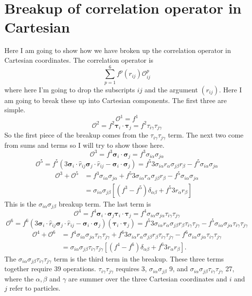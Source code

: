 \documentclass[12pt]{extarticle}
\newcommand{\Oijp}{\mathcal{O}^p_{ij}}
\newcommand{\taui}{\bm{\tau}_i}
\newcommand{\tauj}{\bm{\tau}_j}
\newcommand{\sigmai}{\bm{\sigma}_i}
\newcommand{\sigmaj}{\bm{\sigma}_j}
\newcommand{\rij}{\hat{r}_{ij}}
\newcommand{\sigmaia}{\sigma_{i\alpha}}
\newcommand{\tauig}{\tau_{i\gamma}}
\newcommand{\sigmaja}{\sigma_{j\alpha}}
\newcommand{\sigmajb}{\sigma_{j\beta}}
\newcommand{\taujg}{\tau_{j\gamma}}
\begin{document}
\section{Breakup of correlation operator in Cartesian}
Here I am going to show how we have broken up the correlation operator in Cartesian coordinates. The correlation operator is
\begin{equation}
  \sum_{p=1}^6 f^p(r_{ij}) \Oijp
\end{equation}
where here I'm going to drop the subscripts $ij$ and the argument $(r_{ij})$. Here I am going to break these up into Cartesian components. The first three are simple.
\begin{equation}
  \mathcal{O}^1 = f^1
\end{equation}
\begin{equation}
  \mathcal{O}^2 = f^2 \taui \cdot \tauj = f^2 \tauig \taujg
\end{equation}
So the first piece of the breakup comes from the $\tauig \taujg$ term. The next two come from sums and terms so I will try to show those here.
\begin{equation}
  \mathcal{O}^3 = f^3\sigmai\cdot\sigmaj = f^3\sigmaia\sigmaja
\end{equation}
\begin{equation}
  \mathcal{O}^5 = f^5 \left( 3\sigmai\cdot\rij\sigmaj\cdot\rij - \sigmai\cdot\sigmaj \right) = f^5 3\sigmaia r_\alpha\sigmajb r_\beta - f^5 \sigmaia\sigmaja
\end{equation}
\begin{align}
  \mathcal{O}^3 + \mathcal{O}^5 &= f^3 \sigmaia\sigmaja + f^5 3\sigmaia r_\alpha\sigmajb r_\beta - f^5 \sigmaia\sigmaja \\
  &= \sigmaia\sigmajb \left[ (f^3-f^5)\delta_{\alpha\beta} + f^5 3r_\alpha r_\beta \right]
\end{align}
This is the $\sigmaia\sigmajb$ breakup term. The last term is
\begin{equation}
  \mathcal{O}^4 = f^4\sigmai\cdot\sigmaj\taui\cdot\tauj = f^4\sigmaia\sigmaja\tauig\taujg
\end{equation}
\begin{equation}
  \mathcal{O}^6 = f^6 \left( 3\sigmai\cdot\rij\sigmaj\cdot\rij - \sigmai\cdot\sigmaj \right)(\taui\cdot\tauj) = f^5 3\sigmaia r_\alpha\sigmajb r_\beta\tauig\taujg - f^5 \sigmaia\sigmaja\tauig\taujg
\end{equation}
\begin{align}
  \mathcal{O}^4 + \mathcal{O}^6 &= f^4 \sigmaia\sigmaja\tauig\taujg + f^6 3\sigmaia r_\alpha\sigmajb r_\beta\tauig\taujg - f^6 \sigmaia\sigmaja\tauig\taujg \\
  &= \sigmaia\sigmajb\tauig\taujg \left[ (f^4-f^6)\delta_{\alpha\beta} + f^6 3r_\alpha r_\beta \right].
\end{align}
The $\sigmaia\sigmajb\tauig\taujg$ term is the third term in the breakup. These three terms together require 39 operations. $\tauig\taujg$ requires 3, $\sigmaia\sigmajb$ 9, and $\sigmaia\sigmajb\tauig\taujg$ 27, where the $\alpha, \beta$ and $\gamma$ are summer over the three Cartesian coordinates and $i$ and $j$ refer to particles.



\end{document}
